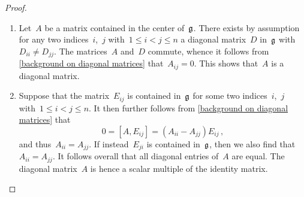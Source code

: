 \begin{proof}
	\leavevmode
	\begin{enumerate}
		\item
			Let~$A$ be a matrix contained in the center of~$\mathfrak{g}$.
			There exists by assumption for any two indices~$i$,~$j$ with~$1 \leq i < j \leq n$ a diagonal matrix~$D$ in~$\mathfrak{g}$ with~$D_{ii} \neq D_{jj}$.
			The matrices~$A$ and~$D$ commute, whence it follows from \cref{background on diagonal matrices} that~$A_{ij} = 0$.
			This shows that~$A$ is a diagonal matrix.
		\item
			Suppose that the matrix~$E_{ij}$ is contained in~$\mathfrak{g}$ for some two indices~$i$,~$j$ with~$1 \leq i < j \leq n$.
			It then further follows from \cref{background on diagonal matrices} that
			\[
				0
				=
				[A, E_{ij}]
				=
				(A_{ii} - A_{jj}) E_{ij} \,,
			\]
			and thus~$A_{ii} = A_{jj}$.
			If instead~$E_{ji}$ is contained in~$\mathfrak{g}$, then we also find that~$A_{ii} = A_{jj}$.
			It follows overall that all diagonal entries of~$A$ are equal.
			The diagonal matrix~$A$ is hence a scalar multiple of the identity matrix.
		\qedhere
	\end{enumerate}
\end{proof}


